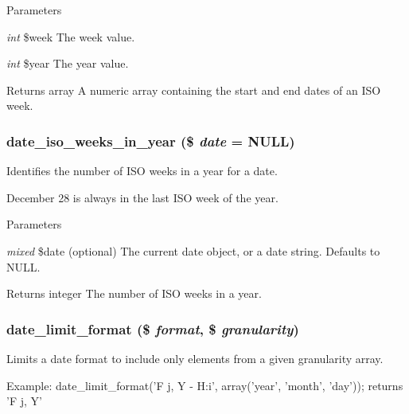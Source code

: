 \begin{DoxyParams}{Parameters}
\item[{\em int}]\$week The week value. \item[{\em int}]\$year The year value.\end{DoxyParams}
\begin{DoxyReturn}{Returns}
array A numeric array containing the start and end dates of an ISO week. 
\end{DoxyReturn}
\hypertarget{date__api_8module_a87b3a294949c7309f5cfd29f39358015}{
\subsubsection[{date\_\-iso\_\-weeks\_\-in\_\-year}]{\setlength{\rightskip}{0pt plus 5cm}date\_\-iso\_\-weeks\_\-in\_\-year (\$ {\em date} = {\ttfamily NULL})}}
\label{date__api_8module_a87b3a294949c7309f5cfd29f39358015}
Identifies the number of ISO weeks in a year for a date.

December 28 is always in the last ISO week of the year.


\begin{DoxyParams}{Parameters}
\item[{\em mixed}]\$date (optional) The current date object, or a date string. Defaults to NULL.\end{DoxyParams}
\begin{DoxyReturn}{Returns}
integer The number of ISO weeks in a year. 
\end{DoxyReturn}
\hypertarget{date__api_8module_a9a2ae59466da6a43b3ff481b081f7096}{
\subsubsection[{date\_\-limit\_\-format}]{\setlength{\rightskip}{0pt plus 5cm}date\_\-limit\_\-format (\$ {\em format}, \/  \$ {\em granularity})}}
\label{date__api_8module_a9a2ae59466da6a43b3ff481b081f7096}
Limits a date format to include only elements from a given granularity array.

Example: date\_\-limit\_\-format('F j, Y -\/ H:i', array('year', 'month', 'day')); returns 'F j, Y'


